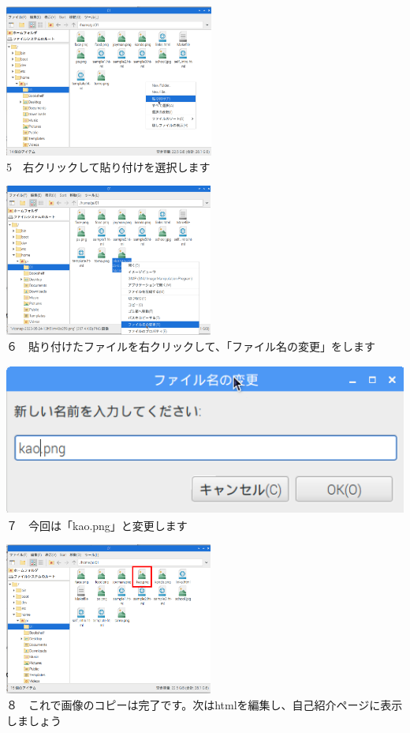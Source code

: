\documentclass[a4paper,12pt]{jarticle}
\begin{document}
\centering
\begin{minipage}{0.45\linewidth}
  \includegraphics[width=\linewidth,height=5cm]{textbook-img168.png}\\
  5　右クリックして貼り付けを選択します
\end{minipage}
\hfill
\vspace{20pt}
\begin{minipage}{0.45\linewidth}
  \includegraphics[width=\linewidth,height=5cm]{textbook-img169.png}\\
  ６　貼り付けたファイルを右クリックして、「ファイル名の変更」をします
\end{minipage}
\begin{minipage}{0.45\linewidth}
  \includegraphics[width=\linewidth,height=5cm]{textbook-img166.png}\\
  ７　今回は「kao.png」と変更します
\end{minipage}
\hfill
\vspace{20pt}
\begin{minipage}{0.45\linewidth}
  \includegraphics[width=\linewidth,height=5cm]{textbook-img170.png}\\
  ８　これで画像のコピーは完了です。次はhtmlを編集し、自己紹介ページに表示しましょう
\end{minipage}
\end{document}
